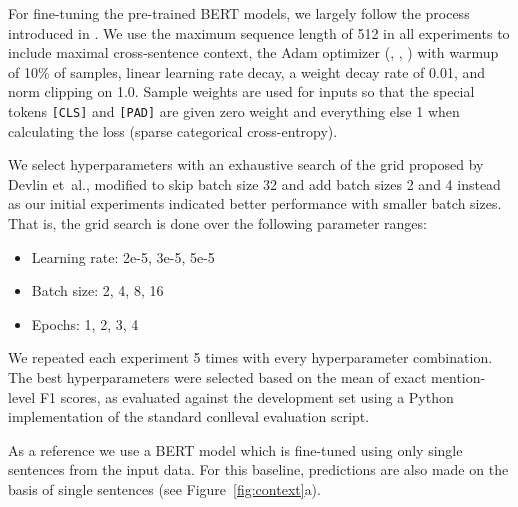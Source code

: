 \documentclass[11pt]{article}
\begin{document}
For fine-tuning the pre-trained BERT models, we largely follow the process introduced in \cite{devlin2018bert}.
We use the maximum sequence length of 512 in all experiments to include maximal cross-sentence context, the Adam optimizer \cite{kingma2014adam} (, , ) with warmup of 10\% of samples, linear learning rate decay, a weight decay rate of 0.01, and norm clipping on 1.0. Sample weights are used for inputs so that the special tokens \texttt{[CLS]} and \texttt{[PAD]} are given zero weight and everything else 1 when calculating the loss (sparse categorical cross-entropy).
 
We select hyperparameters with an exhaustive search of the grid proposed by Devlin et~al., modified to skip batch size 32 and add batch sizes 2 and 4 instead as our initial experiments indicated better performance with smaller batch sizes. That is, the grid search is done over the following parameter ranges: 
\begin{itemize}
    \setlength\itemsep{-0.5em}
    \item Learning rate: 2e-5, 3e-5, 5e-5 
    \item Batch size: 2, 4, 8, 16
    \item Epochs: 1, 2, 3, 4
\end{itemize}
We repeated each experiment 5 times with every hyperparameter combination. The best hyperparameters were selected based on the mean of exact mention-level F1 scores, as evaluated against the development set using a Python implementation of the standard conlleval evaluation script.

As a reference we use a BERT model which is fine-tuned using only single sentences from the input data. For this baseline, predictions are also made on the basis of single sentences (see Figure~\ref{fig:context}a).
\end{document}
